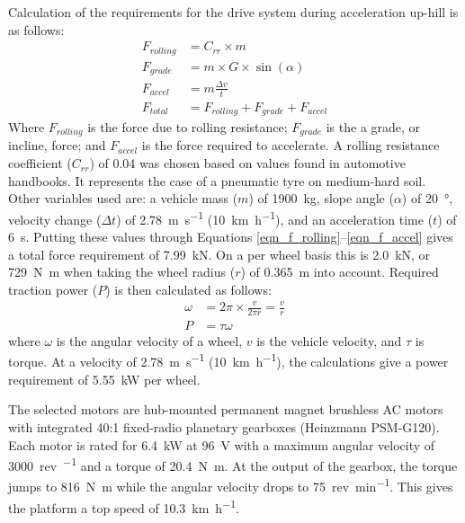\documentclass[preprint,authoryear,12pt]{elsarticle}
\begin{document}
        Calculation of the requirements for the drive system during acceleration up-hill is as follows:
        \begin{align}
        \label{eqn_f_rolling}
        F_{rolling} &= C_{rr} \times m\\
        F_{grade} &= m \times G \times \sin(\alpha)\\
        F_{accel} &= m \frac{\Delta v}{t}\\
        \label{eqn_f_accel}
        F_{total} &= F_{rolling} + F_{grade} + F_{accel}
        \end{align}
        Where $F_{rolling}$ is the force due to rolling resistance; $F_{grade}$ is the a grade, or incline, force; and $F_{accel}$ is the force required to accelerate.
        A rolling resistance coefficient ($C_{rr}$) of 0.04 was chosen based on values found in automotive handbooks.
        It represents the case of a pneumatic tyre on medium-hard soil.
        Other variables used are: a vehicle mass ($m$) of \SI{1900}{\kilo\gram}, slope angle ($\alpha$) of \SI{20}{\degree}, velocity change ($\Delta t$) of \SI{2.78}{\metre\per\second} (\SI{10}{\kilo\meter\per\hour}), and an acceleration time ($t$) of \SI{6}{\second}.
        Putting these values through Equations \ref{eqn_f_rolling}--\ref{eqn_f_accel} gives a total force requirement of \SI{7.99}{\kilo\newton}.
        On a per wheel basis this is \SI{2.0}{\kilo\newton}, or \SI{729}{\newton\meter} when taking the wheel radius ($r$) of \SI{0.365}{\meter} into account.
        Required traction power ($P$) is then calculated as follows:
        \begin{align}
        \label{eqn_f_power}
        \omega &= 2 \pi \times \frac{v}{2 \pi r} = \frac{v}{r}\\
        P &= \tau \omega
        \end{align}
        where $\omega$ is the angular velocity of a wheel, $v$ is the vehicle velocity, and $\tau$ is torque.
        At a velocity of \SI{2.78}{\meter\per\second} (\SI{10}{\kilo\meter\per\hour}), the calculations give a power requirement of \SI{5.55}{\kilo\watt} per wheel.

        The selected motors are hub-mounted permanent magnet brushless AC motors with integrated 40:1 fixed-radio planetary gearboxes (Heinzmann PSM-G120).
        Each motor is rated for \SI{6.4}{\kilo\watt} at \SI{96}{\volt} with a maximum angular velocity of \SI{3000}{rev\per\min} and a torque of \SI{20.4}{\newton\meter}.
        At the output of the gearbox, the torque jumps to \SI{816}{\newton\meter} while the angular velocity drops to \SI{75}{rev\per\minute}.
        This gives the platform a top speed of \SI{10.3}{\kilo\meter\per\hour}.
\end{document}
